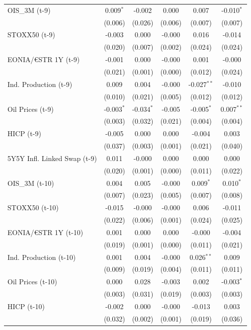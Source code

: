 \begin{longtable}[t]{lccccc}
OIS\_3M (t-9) & 0.009$^{*}$ & -0.002 & 0.000 & 0.007 & -0.010$^{*}$\\
 & (0.006) & (0.026) & (0.006) & (0.007) & (0.007)\\
STOXX50 (t-9) & -0.003 & 0.000 & -0.000 & 0.016 & -0.014\\
 & (0.020) & (0.007) & (0.002) & (0.024) & (0.024)\\
EONIA/€STR 1Y (t-9) & -0.001 & 0.000 & -0.000 & 0.001 & -0.000\\
 & (0.021) & (0.001) & (0.000) & (0.012) & (0.024)\\
Ind. Production (t-9) & 0.009 & 0.004 & -0.000 & -0.027$^{**}$ & -0.010\\
 & (0.010) & (0.021) & (0.005) & (0.012) & (0.012)\\
Oil Prices (t-9) & -0.003$^{*}$ & -0.034$^{*}$ & -0.005 & -0.005$^{*}$ & 0.007$^{**}$\\
 & (0.003) & (0.032) & (0.021) & (0.004) & (0.004)\\
HICP (t-9) & -0.005 & 0.000 & 0.000 & -0.004 & 0.003\\
 & (0.037) & (0.003) & (0.001) & (0.021) & (0.040)\\
5Y5Y Infl. Linked Swap (t-9) & 0.011 & -0.000 & 0.000 & 0.000 & 0.000\\
 & (0.020) & (0.001) & (0.000) & (0.011) & (0.022)\\
OIS\_3M (t-10) & 0.004 & 0.005 & -0.000 & 0.009$^{*}$ & 0.010$^{*}$\\
 & (0.007) & (0.023) & (0.005) & (0.007) & (0.008)\\
STOXX50 (t-10) & -0.015 & -0.000 & -0.000 & 0.006 & -0.011\\
 & (0.022) & (0.006) & (0.001) & (0.024) & (0.025)\\
EONIA/€STR 1Y (t-10) & 0.001 & 0.000 & 0.000 & -0.000 & -0.004\\
 & (0.019) & (0.001) & (0.000) & (0.011) & (0.021)\\
Ind. Production (t-10) & 0.001 & 0.004 & -0.000 & 0.026$^{**}$ & 0.009\\
 & (0.009) & (0.019) & (0.004) & (0.011) & (0.011)\\
Oil Prices (t-10) & 0.000 & 0.028 & -0.003 & 0.002 & -0.003$^{*}$\\
 & (0.003) & (0.031) & (0.019) & (0.003) & (0.003)\\
HICP (t-10) & -0.002 & 0.000 & -0.000 & -0.013 & 0.003\\
 & (0.032) & (0.002) & (0.001) & (0.019) & (0.036)\\

\end{longtable}
